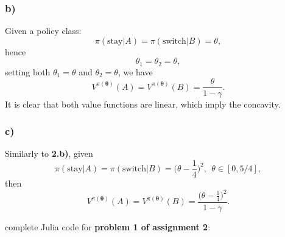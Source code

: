 \documentclass[12pt]{article}
\begin{document}
\subsubsection*{b)}
Given a policy class:
\begin{equation}
    \pi(\text{stay}|A) = \pi(\text{switch}|B) = \theta,
\end{equation}
hence
\begin{equation*}
    \theta_1 = \theta_2 = \theta,
\end{equation*}
setting both $\theta_1 = \theta$ and $\theta_2 = \theta$, we have
\begin{equation*}
    V^{\pi(\boldsymbol\theta)}(A) = V^{\pi(\boldsymbol\theta)}(B) = \frac{\theta}{1-\gamma}.
\end{equation*}
It is clear that both value functions are linear, which imply the concavity.
\subsubsection*{c)}
Similarly to \textbf{2.b)}, given
\begin{equation*}
    \pi(\text{stay}|A) = \pi(\text{switch}|B) = \Big(\theta - \frac{1}{4}\Big)^2, ~~ \theta \in [0, 5/4],
\end{equation*}
then
\begin{equation*}
    V^{\pi(\boldsymbol\theta)}(A) = V^{\pi(\boldsymbol\theta)}(B) = \frac{\Big(\theta - \frac{1}{4}\Big)^2}{1-\gamma}.
\end{equation*}

\newpage
\begin{appendices}
    complete Julia code for \textbf{problem 1 of assignment 2}:
\end{appendices}
\end{document}
